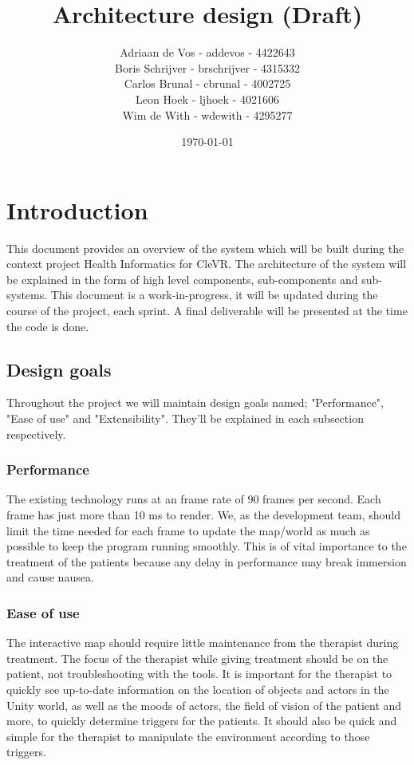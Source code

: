 \documentclass[11pt]{article}
\begin{document}
\title{Architecture design (Draft)}
\author{
	Adriaan de Vos - addevos - 4422643\\
	Boris Schrijver - brschrijver - 4315332\\
	Carlos Brunal - cbrunal - 4002725\\
	Leon Hoek - ljhoek - 4021606\\
	Wim de With - wdewith - 4295277
}
\date{\today}

\maketitle

\newpage
\tableofcontents
\newpage

\section{Introduction}
This document provides an overview of the system which will be built during the context project Health
Informatics for \gls{CleVR}. The architecture of the system will be explained in the form of high level components, sub-components and sub-systems. This document is a work-in-progress, it will be updated during the course of the project, each sprint. A final deliverable will be presented at the time the code is done.

    \subsection{Design goals}
    Throughout the project we will maintain design goals named; "Performance", "Ease of use" and "Extensibility". They'll be explained in each subsection respectively.

        \subsubsection{Performance}
        The existing technology runs at an frame rate of 90 frames per second. Each frame has just more than 10 ms to render. We, as the development team, should limit the time needed for each frame to update the map/world as much as possible to keep the program running smoothly. This is of vital importance to the treatment of the patients because any delay in performance may break immersion and cause nausea.
        
        \subsubsection{Ease of use}
       The interactive map should require little maintenance from the therapist during treatment. The focus of the therapist while giving treatment should be on the patient, not troubleshooting with the tools.
    It is important for the therapist to quickly see up-to-date information on the location of objects and actors in the \gls{Unity} world, as well as the moods of actors, the field of vision of the patient and more, to quickly determine triggers for the patients. It should also be quick and simple for the therapist to manipulate the environment according to those triggers. 
            
\end{document}

